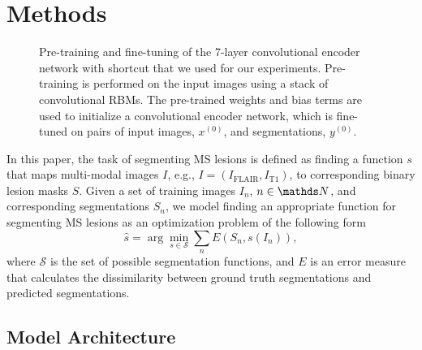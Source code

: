 \section{Methods}
\label{sec:method}

\begin{figure*}[tb]
\centering


\caption{Pre-training and fine-tuning of the 7-layer convolutional encoder
network with shortcut that we used for our experiments. Pre-training is
performed on the input images using a stack of convolutional RBMs. The
pre-trained weights and bias terms are used to initialize a convolutional
encoder network, which is fine-tuned on pairs of input images, $x^{(0)}$, and
segmentations, $y^{(0)}$.}

\label{fig:network}
\end{figure*}

In this paper, the task of segmenting MS lesions is defined as finding a
function $s$ that maps multi-modal images $I$, e.g., $I = (I_\text{FLAIR},
I_\text{T1})$, to corresponding binary lesion masks $S$. Given a set of
training images $I_n$, $n \in \N$, and corresponding segmentations $S_n$, we
model finding an appropriate function for segmenting MS lesions as an
optimization problem of the following form
\begin{equation}
\hat{s} = \arg \min_{s \in \mathcal{S}} \sum_n E(S_n, s(I_n)),
\label{eq:segprob}
\end{equation}
where $\mathcal{S}$ is the set of possible segmentation functions, and $E$ is an
error measure that calculates the dissimilarity between ground truth
segmentations and predicted segmentations.

\subsection{Model Architecture}

